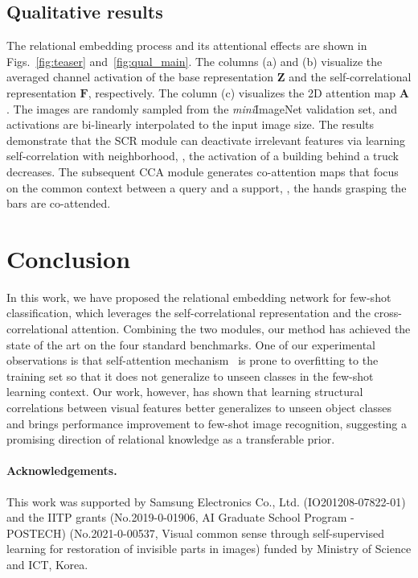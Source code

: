 \documentclass[10pt,twocolumn,letterpaper]{article}
\newcommand{\itmini}{\textit{mini}}
\newcommand{\bF}{\mathbf{F}}
\newcommand{\bA}{\mathbf{A}}
\newcommand{\bZ}{\mathbf{Z}}
\newcommand{\abbself}{SCR\xspace}
\newcommand{\abbcross}{CCA\xspace}
\begin{document}
\subsection{Qualitative results}
\label{sec:qual}
The relational embedding process and its attentional effects are shown in Figs.~\ref{fig:teaser} and~\ref{fig:qual_main}.
The columns (a) and (b) visualize the averaged channel activation of the base representation $\bZ$ and the self-correlational representation $\bF$, respectively.
The column (c) visualizes the 2D attention map $\bA$.
The images are randomly sampled from the \itmini ImageNet validation set, and activations are bi-linearly interpolated to the input image size.
The results demonstrate that the \abbself module can deactivate irrelevant features via learning self-correlation with neighborhood, \eg, the activation of a building behind a truck decreases.
The subsequent \abbcross module generates co-attention maps that focus on the common context between a query and a support, \eg, the hands grasping the bars are co-attended. \section{Conclusion}
In this work, we have proposed the relational embedding network for few-shot classification, which leverages the self-correlational representation and the cross-correlational attention. 
Combining the two modules, our method has achieved the state of the art on the four standard benchmarks.
One of our experimental observations is that self-attention mechanism~\cite{nlsa, lsa} is prone to overfitting to the training set so that it does not generalize to unseen classes in the few-shot learning context.
Our work, however, has shown that learning structural correlations between visual features better generalizes to unseen object classes and brings performance improvement to few-shot image recognition, suggesting a promising direction of relational knowledge as a transferable prior.
 \paragraph{Acknowledgements.}
This work was supported by Samsung Electronics Co., Ltd. (IO201208-07822-01) and the IITP grants (No.2019-0-01906, AI Graduate School Program - POSTECH) (No.2021-0-00537, Visual common sense through self-supervised learning for restoration of invisible parts in images) funded by Ministry of Science and ICT, Korea. 


{\small


}
\end{document}
